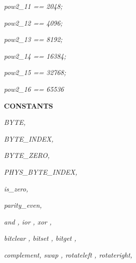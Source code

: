\hspace*{0.20in}\it pow2\_11 \rm == \rm 2\rm 0\rm 4\rm 8\rm ;\hspace*{0.10in}

\hspace*{0.20in}\it pow2\_12 \rm == \rm 4\rm 0\rm 9\rm 6\rm ;\hspace*{0.15in}

\hspace*{0.20in}\it pow2\_13 \rm == \rm 8\rm 1\rm 9\rm 2\rm ;

\hspace*{0.20in}\it pow2\_14 \rm == \rm 1\rm 6\rm 3\rm 8\rm 4\rm ;\hspace*{0.15in}

\hspace*{0.20in}\it pow2\_15 \rm == \rm 3\rm 2\rm 7\rm 6\rm 8\rm ; 

\hspace*{0.20in}\it pow2\_16 \rm == \rm 6\rm 5\rm 5\rm 3\rm 6\hspace*{0.35in}

\hspace*{0.20in}

\bf CONSTANTS

\hspace*{0.20in}

\hspace*{0.20in}\it BYTE\rm ,

\hspace*{0.20in}\it BYTE\_INDEX\rm ,

\hspace*{0.20in}\it BYTE\_ZERO\rm ,

\hspace*{0.20in}\it PHYS\_BYTE\_INDEX\rm ,

\hspace*{0.20in}

\hspace*{0.20in}

\hspace*{0.20in}\it is\_zero\rm ,

\hspace*{0.20in}\it parity\_even\rm ,

\hspace*{0.20in}\it and \rm , \it ior \rm , \it xor \rm ,

\hspace*{0.20in}\it bitclear \rm , \it bitset \rm , \it bitget \rm ,

\hspace*{0.20in}\it complement\rm , \it swap \rm , \it rotateleft \rm , \it rotateright\rm ,\hspace*{0.15in}

